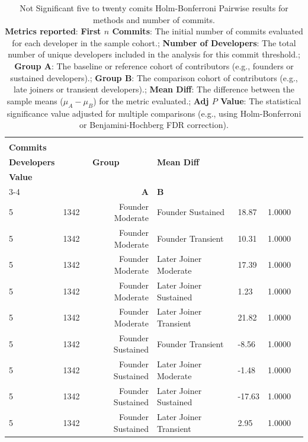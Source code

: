 \begin{table}[H]
\centering
\setlength{\tabcolsep}{2pt}
\caption[Not Significant Holm-Bonferroni Pairwise five and ten commits results methods]{Not Significant five to twenty comits Holm-Bonferroni Pairwise results for methods and number of commits. \\ \textbf{Metrics reported}:   \textbf{First $n$ Commits}: The initial number of commits evaluated for each developer in the sample cohort.;  \textbf{Number of Developers}: The total number of unique developers included in the analysis for this commit threshold.;  \textbf{Group A}: The baseline or reference cohort of contributors (e.g., founders or sustained developers).;  \textbf{Group B}: The comparison cohort of contributors (e.g., late joiners or transient developers).;  \textbf{Mean Diff}: The difference between the sample means ($\mu_A - \mu_B$) for the metric evaluated.;  \textbf{Adj $P$ Value}: The statistical significance value adjusted for multiple comparisons (e.g., using Holm-Bonferroni or Benjamini-Hochberg FDR correction).
}
\begin{tabular}{l r r l l r r}
\toprule
\makecell[t]{\textbf{First $n$}\\\textbf{Commits}} & \makecell[t]{\textbf{Number of}\\\textbf{Developers}} & \multicolumn{2}{c}{\textbf{Group}} & \textbf{Mean Diff} & \makecell[t]{\textbf{Adj $P$}\\\textbf{Value}} \\ 
\cmidrule(lr){3-4}
 &  & \textbf{A} & \textbf{B} &  &  \\ 
\midrule
5 & 1342 & Founder Moderate & Founder Sustained & 18.87 & 1.0000 \\ 
5 & 1342 & Founder Moderate & Founder Transient & 10.31 & 1.0000 \\ 
5 & 1342 & Founder Moderate & Later Joiner Moderate & 17.39 & 1.0000 \\ 
5 & 1342 & Founder Moderate & Later Joiner Sustained & 1.23 & 1.0000 \\ 
5 & 1342 & Founder Moderate & Later Joiner Transient & 21.82 & 1.0000 \\ 
5 & 1342 & Founder Sustained & Founder Transient & -8.56 & 1.0000 \\ 
5 & 1342 & Founder Sustained & Later Joiner Moderate & -1.48 & 1.0000 \\ 
5 & 1342 & Founder Sustained & Later Joiner Sustained & -17.63 & 1.0000 \\ 
5 & 1342 & Founder Sustained & Later Joiner Transient & 2.95 & 1.0000 \\ 

\end{tabular}
\end{table}
